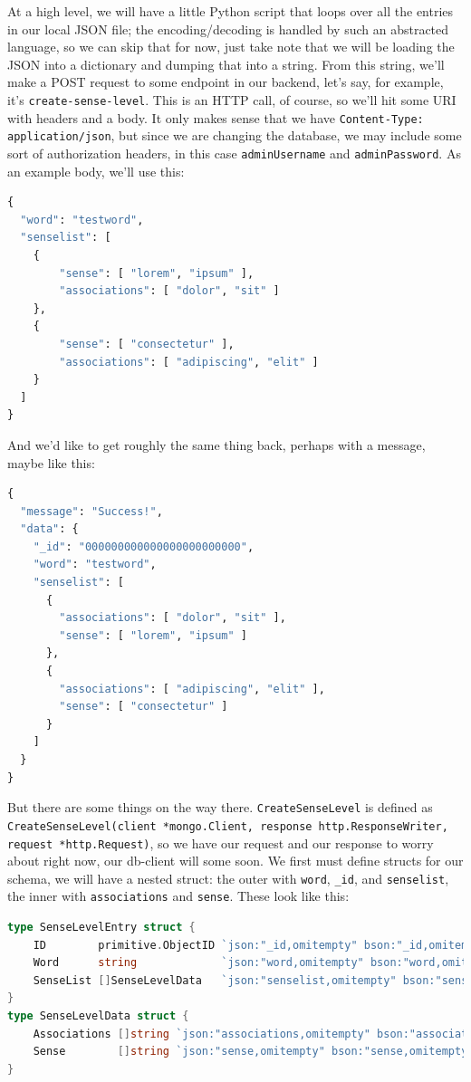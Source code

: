 \documentclass[11pt, twoside, reqno]{book}
\begin{document}
At a high level, we will have a little Python script that loops over all the entries in our local JSON file; the encoding/decoding is handled by such an abstracted language, so we can skip that for now, just take note that we will be loading the JSON into a dictionary and dumping that into a string. From this string, we'll make a POST request to some endpoint in our backend, let's say, for example, it's  \texttt{create-sense-level}. This is an HTTP call, of course, so we'll hit some URI with headers and a body. It only makes sense that we have \texttt{Content-Type: application/json}, but since we are changing the database, we may include some sort of authorization headers, in this case \texttt{adminUsername} and \texttt{adminPassword}. As an example body, we'll use this:
\begin{lstlisting}[language=Python]
{
  "word": "testword",
  "senselist": [
  	{
  		"sense": [ "lorem", "ipsum" ],
  		"associations": [ "dolor", "sit" ]
  	},
  	{
  		"sense": [ "consectetur" ],
  		"associations": [ "adipiscing", "elit" ]
  	}
  ]
}
\end{lstlisting}

And we'd like to get roughly the same thing back, perhaps with a message, maybe like this:
\begin{lstlisting}[language=Python]
{
  "message": "Success!",
  "data": {
    "_id": "000000000000000000000000",
    "word": "testword",
    "senselist": [
      {
        "associations": [ "dolor", "sit" ],
        "sense": [ "lorem", "ipsum" ]
      },
      {
        "associations": [ "adipiscing", "elit" ],
        "sense": [ "consectetur" ]
      }
    ]
  }
}
\end{lstlisting}

But there are some things on the way there. \texttt{CreateSenseLevel} is defined as \texttt{CreateSenseLevel(client *mongo.Client, response http.ResponseWriter, request *http.Request)}, so we have our request and our response to worry about right now, our db-client will some soon. We first must define structs for our schema, we will have a nested struct: the outer with \texttt{word}, \texttt{\_id}, and \texttt{senselist}, the inner with \texttt{associations} and \texttt{sense}. These look like this:
\begin{lstlisting}[language=Go]
type SenseLevelEntry struct {
	ID        primitive.ObjectID `json:"_id,omitempty" bson:"_id,omitempty"`
	Word      string             `json:"word,omitempty" bson:"word,omitempty"`
	SenseList []SenseLevelData   `json:"senselist,omitempty" bson:"senselist,omitempty"`
}
type SenseLevelData struct {
	Associations []string `json:"associations,omitempty" bson:"associations,omitempty"`
	Sense        []string `json:"sense,omitempty" bson:"sense,omitempty"`
}
\end{lstlisting}
\end{document}
